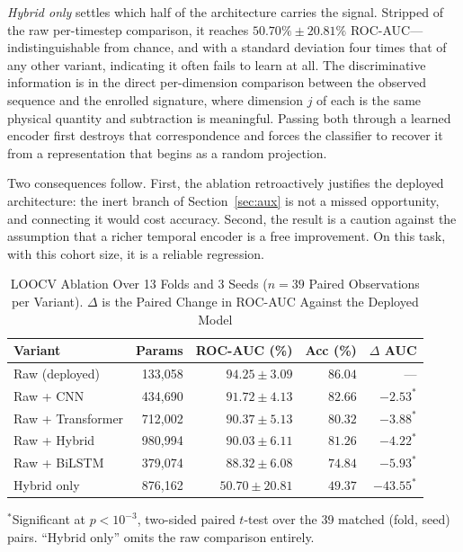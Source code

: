 \documentclass[journal]{IEEEtran}
\newcommand{\tabhead}[1]{\textbf{#1}}
\begin{document}
\emph{Hybrid only} settles which half of the architecture carries the signal.
Stripped of the raw per-timestep comparison, it reaches $50.70\% \pm 20.81\%$
ROC-AUC---indistinguishable from chance, and with a standard deviation four
times that of any other variant, indicating it often fails to learn at all. The
discriminative information is in the direct per-dimension comparison between
the observed sequence and the enrolled signature, where dimension $j$ of each is
the same physical quantity and subtraction is meaningful. Passing both through
a learned encoder first destroys that correspondence and forces the classifier
to recover it from a representation that begins as a random projection.

Two consequences follow. First, the ablation retroactively justifies the
deployed architecture: the inert branch of Section~\ref{sec:aux} is not a
missed opportunity, and connecting it would cost accuracy. Second, the result
is a caution against the assumption that a richer temporal encoder is a free
improvement. On this task, with this cohort size, it is a reliable
regression.

\begin{table}[!t]
\caption{LOOCV Ablation Over 13 Folds and 3 Seeds ($n = 39$ Paired
Observations per Variant). $\Delta$ is the Paired Change in ROC-AUC Against the
Deployed Model}
\label{tab:ablation}
\centering
\footnotesize
\begin{tabular}{@{}lrrrr@{}}
\toprule
\tabhead{Variant} & \tabhead{Params} & \tabhead{ROC-AUC (\%)} &
\tabhead{Acc (\%)} & \tabhead{$\Delta$ AUC} \\
\midrule
Raw (deployed)     & 133{,}058 & $\mathbf{94.25 \pm 3.09}$ & $\mathbf{86.04}$ & --- \\
Raw + CNN          & 434{,}690 & $91.72 \pm 4.13$ & $82.66$ & $-2.53^{\ast}$ \\
Raw + Transformer  & 712{,}002 & $90.37 \pm 5.13$ & $80.32$ & $-3.88^{\ast}$ \\
Raw + Hybrid       & 980{,}994 & $90.03 \pm 6.11$ & $81.26$ & $-4.22^{\ast}$ \\
Raw + BiLSTM       & 379{,}074 & $88.32 \pm 6.08$ & $74.84$ & $-5.93^{\ast}$ \\
Hybrid only        & 876{,}162 & $50.70 \pm 20.81$ & $49.37$ & $-43.55^{\ast}$ \\
\bottomrule
\end{tabular}

\vspace{2pt}
\raggedright\footnotesize
$^{\ast}$Significant at $p < 10^{-3}$, two-sided paired $t$-test over the 39
matched (fold, seed) pairs. ``Hybrid only'' omits the raw comparison entirely.
\end{table}
\end{document}

